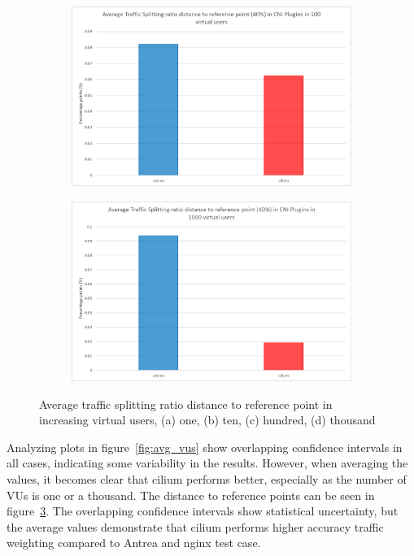 \begin{figure}[H]
    \begin{subfigure}[b]{0.48\textwidth}
        \includegraphics[width=\textwidth]{plots/traffic-splitting/time_window_5_100vu_reference_cloud.png}
        \label{fig:reference_100vu}
        \caption{}
    \end{subfigure}
    \begin{subfigure}[b]{0.48\textwidth}
        \includegraphics[width=\textwidth]{plots/traffic-splitting/time_window_5_1000vu_reference_cloud.png}
        \label{fig:reference_1000vu}
        \caption{}
    \end{subfigure}

    \caption{Average traffic splitting ratio distance to reference point in increasing virtual users, (a) one, (b) ten, (c) hundred, (d) thousand }
    \label{fig:referencesIngress}
\end{figure}

Analyzing plots in figure~\ref{fig:avg_vus} show overlapping confidence intervals in all cases, indicating some variability in the results. However, when averaging the values, it becomes clear that cilium performs better, especially as the number of VUs is one or a thousand. The distance to reference points can be seen in figure~\ref{fig:referencesIngress}. The overlapping confidence intervals show statistical uncertainty, but the average values demonstrate that cilium performs higher accuracy traffic weighting compared to Antrea and nginx test case.
